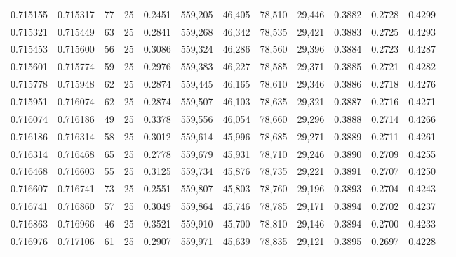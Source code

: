 \begin{tabular}{rrrrrrrrrrrrr}
0.715155 & 0.715317 &    77 &  25 &                                     0.2451 & 559,205 &  46,405 &  78,510 &  29,446 & 0.3882 & 0.2728 & 0.4299 \\
0.715321 & 0.715449 &    63 &  25 &                                     0.2841 & 559,268 &  46,342 &  78,535 &  29,421 & 0.3883 & 0.2725 & 0.4293 \\
0.715453 & 0.715600 &    56 &  25 &                                     0.3086 & 559,324 &  46,286 &  78,560 &  29,396 & 0.3884 & 0.2723 & 0.4287 \\
0.715601 & 0.715774 &    59 &  25 &                                     0.2976 & 559,383 &  46,227 &  78,585 &  29,371 & 0.3885 & 0.2721 & 0.4282 \\
0.715778 & 0.715948 &    62 &  25 &                                     0.2874 & 559,445 &  46,165 &  78,610 &  29,346 & 0.3886 & 0.2718 & 0.4276 \\
0.715951 & 0.716074 &    62 &  25 &                                     0.2874 & 559,507 &  46,103 &  78,635 &  29,321 & 0.3887 & 0.2716 & 0.4271 \\
0.716074 & 0.716186 &    49 &  25 &                                     0.3378 & 559,556 &  46,054 &  78,660 &  29,296 & 0.3888 & 0.2714 & 0.4266 \\
0.716186 & 0.716314 &    58 &  25 &                                     0.3012 & 559,614 &  45,996 &  78,685 &  29,271 & 0.3889 & 0.2711 & 0.4261 \\
0.716314 & 0.716468 &    65 &  25 &                                     0.2778 & 559,679 &  45,931 &  78,710 &  29,246 & 0.3890 & 0.2709 & 0.4255 \\
0.716468 & 0.716603 &    55 &  25 &                                     0.3125 & 559,734 &  45,876 &  78,735 &  29,221 & 0.3891 & 0.2707 & 0.4250 \\
0.716607 & 0.716741 &    73 &  25 &                                     0.2551 & 559,807 &  45,803 &  78,760 &  29,196 & 0.3893 & 0.2704 & 0.4243 \\
0.716741 & 0.716860 &    57 &  25 &                                     0.3049 & 559,864 &  45,746 &  78,785 &  29,171 & 0.3894 & 0.2702 & 0.4237 \\
0.716863 & 0.716966 &    46 &  25 &                                     0.3521 & 559,910 &  45,700 &  78,810 &  29,146 & 0.3894 & 0.2700 & 0.4233 \\
0.716976 & 0.717106 &    61 &  25 &                                     0.2907 & 559,971 &  45,639 &  78,835 &  29,121 & 0.3895 & 0.2697 & 0.4228 \\

\end{tabular}
